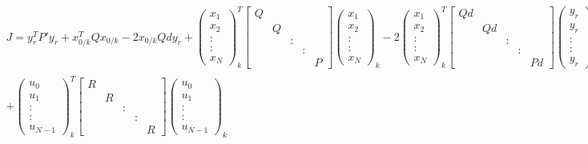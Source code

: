 \documentclass[french]{article}
\begin{document}
	\begin{multline}
		J = y_r^TP'y_r + x_{0/k}^T Q x_{0/k} - 2 x_{0/k} Qd y_r + \begin{pmatrix}
			x_1 \\ 
			x_2 \\ 
			: \\ 
			: \\ 
			x_N
		\end{pmatrix}^T_k \begin{bmatrix}
			Q &  &  &  &  \\ 
			& Q &  &  &  \\ 
			&  & : &  &  \\ 
			&  &  & : &  \\ 
			&  &  &  & P
		\end{bmatrix} \begin{pmatrix}
			x_1 \\ 
			x_2 \\ 
			: \\ 
			: \\ 
			x_N
		\end{pmatrix}_k - 2 \begin{pmatrix}
			x_1 \\ 
			x_2 \\ 
			: \\ 
			: \\ 
			x_N
		\end{pmatrix}^T_k \begin{bmatrix}
			Qd &  &  &  &  \\ 
			& Qd &  &  &  \\ 
			&  & : &  &  \\ 
			&  &  & : &  \\ 
			&  &  &  & Pd
		\end{bmatrix} \begin{pmatrix}
			y_r \\ 
			y_r \\ 
			: \\ 
			: \\ 
			y_r
		\end{pmatrix}_k \\
	+	\begin{pmatrix}
		u_0 \\ 
		u_1 \\ 
		: \\ 
		: \\ 
		u_{N-1}
		\end{pmatrix}^T_k \begin{bmatrix}
		R &  &  &  &  \\ 
		& R &  &  &  \\ 
		&  & : &  &  \\ 
		&  &  & : &  \\ 
		&  &  &  & R
		\end{bmatrix} \begin{pmatrix}
		u_0 \\ 
		u_1 \\ 
		: \\ 
		: \\ 
		u_{N-1}
		\end{pmatrix}_k \nonumber
	\end{multline}
\end{document}
